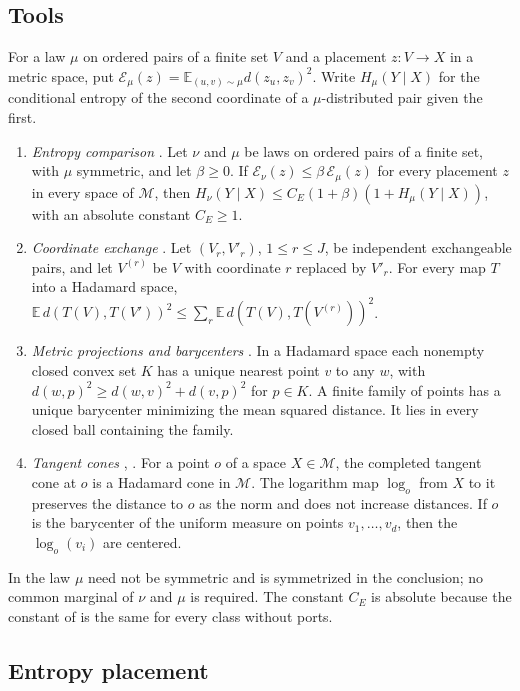 \documentclass[11pt]{article}
\theoremstyle{remark}
\newcommand{\E}{\mathbb E}
\newcommand{\cM}{\mathcal M}
\newcommand{\cE}{\mathcal E}
\begin{document}
\subsection{Tools}
For a law \(\mu\) on ordered pairs of a finite set \(V\) and a placement
\(z\colon V\to X\) in a metric space, put
\(\cE_\mu(z)=\E_{(u,v)\sim\mu}d(z_u,z_v)^2\). Write \(H_\mu(Y\mid X)\)
for the conditional entropy of the second coordinate of a
\(\mu\)-distributed pair given the first.
\begin{enumerate}
\item[(E1)] \emph{Entropy comparison} \cite[Corollary 5.2]{hc}. Let
\(\nu\) and \(\mu\) be laws on ordered pairs of a finite set, with
\(\mu\) symmetric, and let \(\beta\ge0\). If
\(\cE_\nu(z)\le\beta\,\cE_\mu(z)\) for every placement \(z\) in every
space of \(\cM\), then
\(H_\nu(Y\mid X)\le C_E(1+\beta)(1+H_\mu(Y\mid X))\), with an absolute
constant \(C_E\ge1\).
\item[(E2)] \emph{Coordinate exchange} \cite[Equation (7.1)]{hc}. Let
\((V_r,V'_r)\), \(1\le r\le J\), be independent exchangeable pairs, and
let \(V^{(r)}\) be \(V\) with coordinate \(r\) replaced by \(V'_r\). For
every map \(T\) into a Hadamard space,
\(\E\,d(T(V),T(V'))^2\le\sum_r\E\,d(T(V),T(V^{(r)}))^2\).
\item[(E3)] \emph{Metric projections and barycenters} \cite{bh,sturm}.
In a Hadamard space each nonempty closed convex set \(K\) has a unique
nearest point \(v\) to any \(w\), with
\(d(w,p)^2\ge d(w,v)^2+d(v,p)^2\) for \(p\in K\).
A finite family of points has a unique barycenter minimizing the mean
squared distance. It lies in every closed ball containing the family.
\item[(E4)] \emph{Tangent cones} \cite[Section 7.4]{hc}, \cite{bh}. For
a point \(o\) of a space \(X\in\cM\), the completed tangent cone at
\(o\) is a Hadamard cone in \(\cM\). The logarithm map \(\log_o\) from
\(X\) to it preserves the distance to \(o\) as the norm and does not
increase distances. If \(o\) is the barycenter of the uniform measure on
points \(v_1,\ldots,v_d\), then the \(\log_o(v_i)\) are centered.
\end{enumerate}
In \cite[Corollary 5.2]{hc} the law \(\mu\) need not be symmetric and is
symmetrized in the conclusion; no common marginal of \(\nu\) and \(\mu\)
is required. The constant \(C_E\) is absolute because the constant of
\cite[Theorem 5.1]{hc} is the same for every class without ports.

\subsection{Entropy placement}
\end{document}
